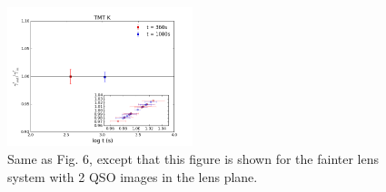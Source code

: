 \documentclass[a4paper,11pt]{article}
\begin{document}
\begin{figure}
\begin{center}
\includegraphics[width=0.48\textwidth]{figures/gamma_135949_anti_2QSOimages_TMT.png}
\end{center}
\caption{Same as Fig. 6, except that this figure is shown for the fainter lens system with 2 QSO images in the lens plane.}
\label{fig:gamma_fainter_2QSOimages}
\end{figure}
\end{document}
